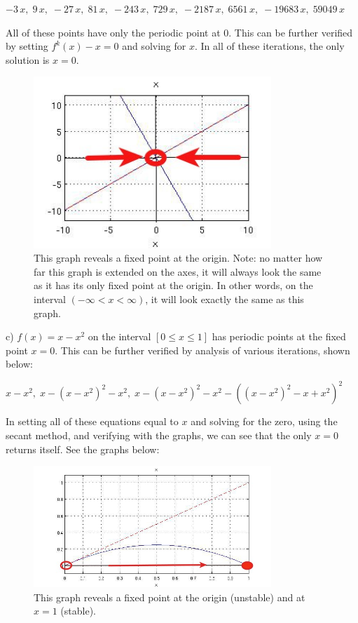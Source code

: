 \documentclass[12pt]{article}
\newenvironment{myenv}{\begin{adjustwidth}{1cm}{}}{\end{adjustwidth}}
\begin{document}
\begin{myenv}
$- 3\, x,\; 9\, x,\; - 27\, x,\; 81\, x,\; - 243\, x,\; 729\, x,\; - 2187\, x,\; 6561\, x,\; - 19683\, x,\; 59049\, x$

 All of these points have only the periodic point at 0. This can be further verified by setting $f^k(x) - x = 0$ and solving for $x$. In all of these iterations, the only solution is $x = 0$.
 
\begin{figure} [H]
    \centering
    \includegraphics[width=0.8\textwidth]{2_3b}
    \caption{This graph reveals a fixed point at the origin. Note: no matter how far this graph is extended on the axes, it will always look the same as it has its only fixed point at the origin. In other words, on the interval $(-\infty < x < \infty)$, it will look exactly the same as this graph. }
    \label{figure:a4}
\end{figure}

c) $f(x) = x-x^2$ on the interval $[0 \le x \le 1]$ has periodic points at the fixed point $x = 0$. This can be further verified by analysis of various iterations, shown below:

$x - x^2,\; x - {\left(x - x^2\right)}^2 - x^2,\; x - {\left(x - x^2\right)}^2 - x^2 - {\left({\left(x - x^2\right)}^2 - x + x^2\right)}^2$

In setting all of these equations equal to $x$ and solving for the zero, using the secant method, and verifying with the graphs, we can see that the only $x = 0$ returns itself. See the graphs below:

\begin{figure} [H]
    \centering
    \includegraphics[width=0.8\textwidth]{2_3c}
    \caption{This graph reveals a fixed point at the origin (unstable) and at $x = 1$ (stable).}
    \label{figure:a4}
\end{figure}


\end{myenv}
\end{document}

